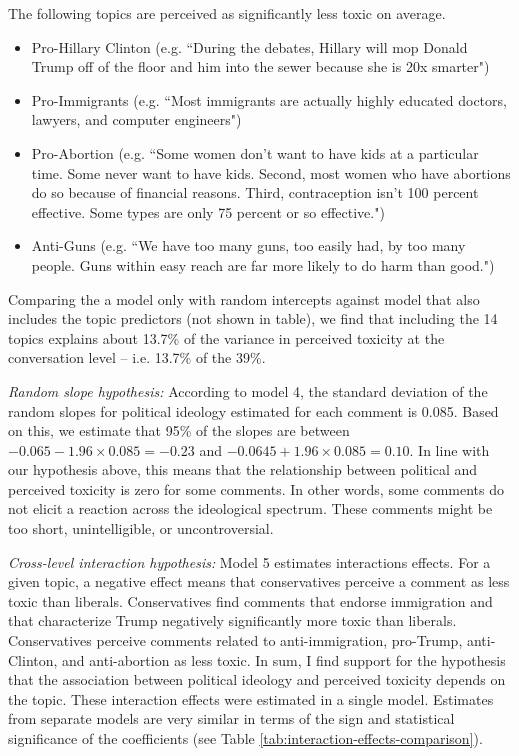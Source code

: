 \documentclass{article}
\begin{document}
The following topics are perceived as significantly less toxic on average.

\begin{itemize}
    \item Pro-Hillary Clinton (e.g. ``During the debates, Hillary will mop Donald Trump off of the floor and him into the sewer because she is 20x smarter")
    \item Pro-Immigrants (e.g. ``Most immigrants are actually highly educated doctors, lawyers, and computer engineers")
    \item Pro-Abortion (e.g. ``Some women don't want to have kids at a particular time. Some never want to have kids. Second, most women who have abortions do so because of financial reasons. Third, contraception isn't 100 percent effective. Some types are only 75 percent or so effective.")
    \item Anti-Guns (e.g. ``We have too many guns, too easily had, by too many people. Guns within easy reach are far more likely to do harm than good.")
\end{itemize}

Comparing the a model only with random intercepts against model that also includes the topic predictors (not shown in table), we find that including the 14 topics explains about 13.7\% of the variance in perceived toxicity at the conversation level -- i.e. 13.7\% of the 39\%. 



\textit{Random slope hypothesis:} According to model 4, the standard deviation of the random slopes for political ideology estimated for each comment is 0.085. Based on this, we estimate that 95\% of the slopes are between $-0.065 - 1.96\times 0.085=-0.23$ and  $-0.0645 + 1.96 \times 0.085=0.10$. In line with our hypothesis above, this means that the relationship between political and perceived toxicity is zero for some comments. In other words, some comments do not elicit a reaction across the ideological spectrum. These comments might be too short, unintelligible, or uncontroversial.

\textit{Cross-level interaction hypothesis:} Model 5 estimates interactions effects. For a given topic, a negative effect means that conservatives perceive a comment as less toxic than liberals. Conservatives find comments that endorse immigration and that characterize Trump negatively significantly more toxic than liberals. Conservatives perceive comments related to anti-immigration, pro-Trump, anti-Clinton, and anti-abortion as less toxic. In sum, I find support for the hypothesis that the association between political ideology and perceived toxicity depends on the topic. These interaction effects were estimated in a single model. Estimates from separate models are very similar in terms of the sign and statistical significance of the coefficients (see Table \ref{tab:interaction-effects-comparison}).
\end{document}
